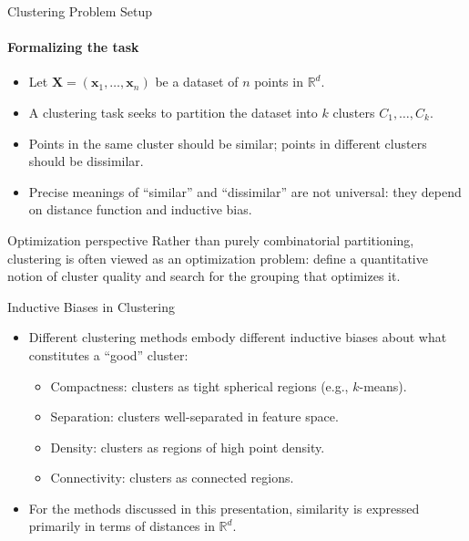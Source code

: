 \begin{frame}{Clustering Problem Setup}
  \framesubtitle{Formalizing the task}
  \begin{itemize}
    \item Let $\mathbf{X}=(\mathbf{x}_1,\ldots,\mathbf{x}_n)$ be a dataset of $n$ points in
          $\mathbb{R}^d$.
    \item A clustering task seeks to partition the dataset into $k$ clusters
          $C_1,\ldots,C_k$.
    \item Points in the same cluster should be \alert{similar}; points in different clusters
          should be \alert{dissimilar}.
    \item Precise meanings of ``similar'' and ``dissimilar'' are not universal: they depend on
          distance function and inductive bias.
  \end{itemize}
  \begin{block}{Optimization perspective}
    Rather than purely combinatorial partitioning, clustering is often viewed as an
    \alert{optimization problem}: define a quantitative notion of cluster quality and search
    for the grouping that optimizes it.
  \end{block}
\end{frame}

\begin{frame}{Inductive Biases in Clustering}
  \begin{itemize}
    \item Different clustering methods embody different inductive biases about what constitutes
          a ``good'' cluster:
      \begin{itemize}
        \item \alert{Compactness}: clusters as tight spherical regions (e.g., $k$-means).
        \item \alert{Separation}: clusters well-separated in feature space.
        \item \alert{Density}: clusters as regions of high point density.
        \item \alert{Connectivity}: clusters as connected regions.
      \end{itemize}
    \item For the methods discussed in this presentation, similarity is expressed primarily
          in terms of \alert{distances in $\mathbb{R}^d$}.
  \end{itemize}
\end{frame}

